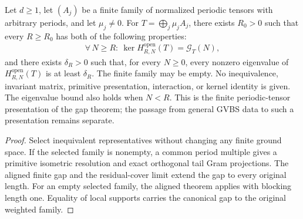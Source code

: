 \begin{lemma}
    \label{thm:periodic_family_uniform_original_open_gap}
    \leanok
    Let $d\ge1$, let $(A_j)$ be a finite family of normalized periodic
    tensors with arbitrary periods, and let $\mu_j\ne0$.
    For $T=\bigoplus_j\mu_jA_j$, there exists $R_0>0$ such that every
    $R\ge R_0$ has both of the following properties:
    \begin{align}
        \forall\,N\ge R:\ \ker H_{R,N}^{\mathrm{open}}(T)=\mathcal G_T(N),
    \end{align}
    and there exists $\delta_R>0$ such that, for every $N\ge0$, every
    nonzero eigenvalue of $H_{R,N}^{\mathrm{open}}(T)$ is at least
    $\delta_R$.
    The finite family may be empty. No inequivalence, invariant matrix,
    primitive presentation, interaction, or kernel identity is given.
    The eigenvalue bound also holds when $N<R$.
    This is the finite periodic-tensor presentation of the gap theorem;
    the passage from general GVBS data to such a presentation remains
    separate.
\end{lemma}
\begin{proof}\leanok
    Select inequivalent representatives without changing any finite
    ground space. If the selected family is nonempty, a common period
    multiple gives a primitive isometric resolution and exact
    orthogonal tail Gram projections. The aligned finite gap and the
    residual-cover limit extend the gap to every original length.
    For an empty selected family, the aligned theorem applies with
    blocking length one. Equality of local supports carries the
    canonical gap to the original weighted family.
\end{proof}

